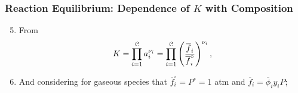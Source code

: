 \documentclass[10pt,compress,unknownkeysallowed]{beamer}
\begin{document}
\begin{frame}
  \frametitle{Reaction Equilibrium:  Dependence of $K$ with Composition } 
      \begin{enumerate} \setcounter{enumi}{4} 
         \item<1-> From 
           \begin{displaymath}
                K = \prod\limits_{i=1}^{\mathcal{C}} a_{i}^{\nu_{i}} = \prod\limits_{i=1}^{\mathcal{C}} \left(\displaystyle\frac{\overline{f}_{i}}{\overline{f}_{i}^{\circ}}\right)^{\nu_{i}},
           \end{displaymath} 
         \item<2-> And considering for gaseous species that $\overline{f}_{i}^{\circ}=P^{\circ}=1$ atm and $\overline{f}_{i} = \overline{\phi}_{i}y_{i}P$;
      \end{enumerate}

\end{frame}
\end{document}
